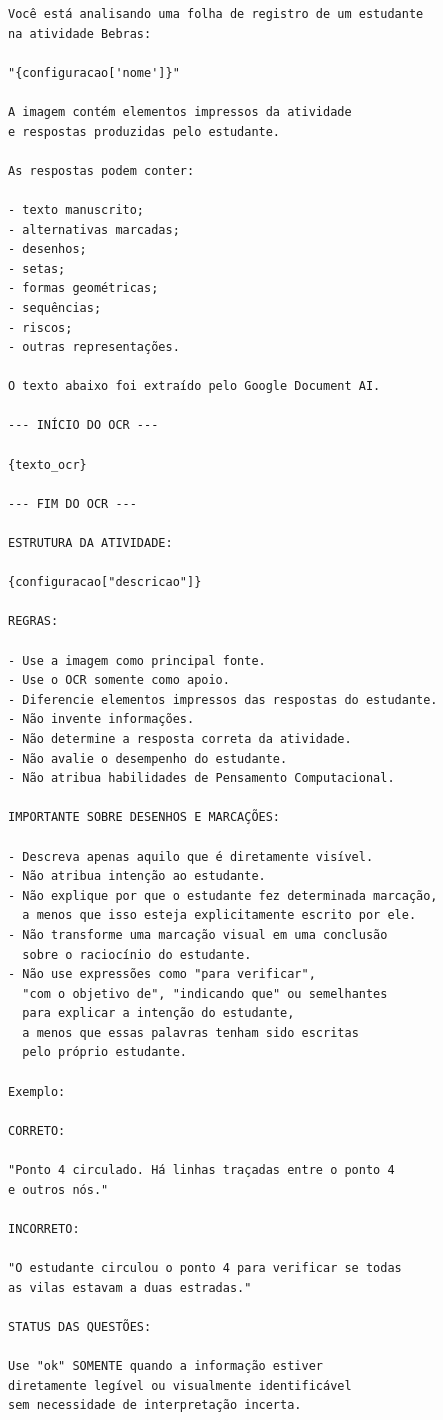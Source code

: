 \begin{lstlisting}[style=prompt]
Você está analisando uma folha de registro de um estudante
na atividade Bebras:

"{configuracao['nome']}"

A imagem contém elementos impressos da atividade
e respostas produzidas pelo estudante.

As respostas podem conter:

- texto manuscrito;
- alternativas marcadas;
- desenhos;
- setas;
- formas geométricas;
- sequências;
- riscos;
- outras representações.

O texto abaixo foi extraído pelo Google Document AI.

--- INÍCIO DO OCR ---

{texto_ocr}

--- FIM DO OCR ---

ESTRUTURA DA ATIVIDADE:

{configuracao["descricao"]}

REGRAS:

- Use a imagem como principal fonte.
- Use o OCR somente como apoio.
- Diferencie elementos impressos das respostas do estudante.
- Não invente informações.
- Não determine a resposta correta da atividade.
- Não avalie o desempenho do estudante.
- Não atribua habilidades de Pensamento Computacional.

IMPORTANTE SOBRE DESENHOS E MARCAÇÕES:

- Descreva apenas aquilo que é diretamente visível.
- Não atribua intenção ao estudante.
- Não explique por que o estudante fez determinada marcação,
  a menos que isso esteja explicitamente escrito por ele.
- Não transforme uma marcação visual em uma conclusão
  sobre o raciocínio do estudante.
- Não use expressões como "para verificar",
  "com o objetivo de", "indicando que" ou semelhantes
  para explicar a intenção do estudante,
  a menos que essas palavras tenham sido escritas
  pelo próprio estudante.

Exemplo:

CORRETO:

"Ponto 4 circulado. Há linhas traçadas entre o ponto 4
e outros nós."

INCORRETO:

"O estudante circulou o ponto 4 para verificar se todas
as vilas estavam a duas estradas."

STATUS DAS QUESTÕES:

Use "ok" SOMENTE quando a informação estiver
diretamente legível ou visualmente identificável
sem necessidade de interpretação incerta.


\end{lstlisting}
